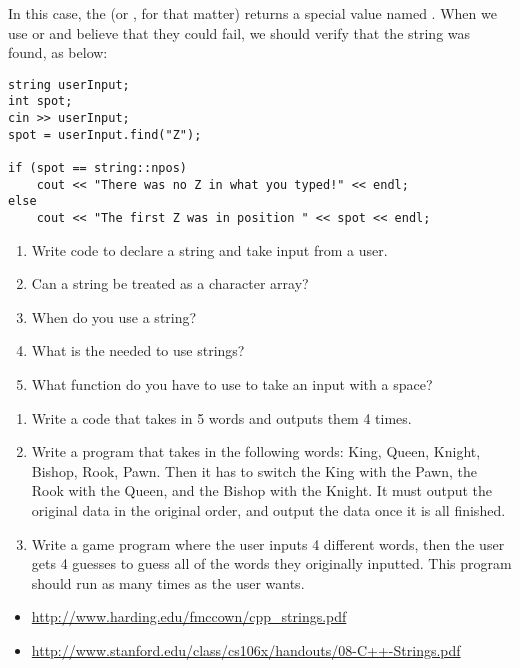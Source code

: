 \noindent In this case, the  (or , for that matter) returns a special value named .
When we use  or  and believe that they could fail, we should verify that the string was found, as below:

\noindent\begin{minipage}{\textwidth}\begin{lstlisting}
string userInput;
int spot;
cin >> userInput;
spot = userInput.find("Z");

if (spot == string::npos)
	cout << "There was no Z in what you typed!" << endl;
else
	cout << "The first Z was in position " << spot << endl;
\end{lstlisting}\end{minipage}
\begin{enumerate}
\item Write code to declare a string and take input from a user.
\item Can a string be treated as a character array?
\item When do you use a string?
\item What is the  needed to use strings?
\item What function do you have to use to take an input with a space?
\end{enumerate}

\begin{enumerate}
\item Write a code that takes in 5 words and outputs them 4 times.

\item Write a program that takes in the following words: King, Queen, Knight, Bishop, Rook, Pawn. 
Then it has to switch the King with the Pawn, the Rook with the Queen, and the Bishop with the Knight.
It must output the original data in the original order, and output the data once it is all finished.

\item Write a game program where the user inputs 4 different words, then the user gets 4 guesses to guess all of the words they originally inputted.
This program should run as many times as the user wants.
\end{enumerate}



\begin{itemize}
\item \url{http://www.harding.edu/fmccown/cpp_strings.pdf}
\item \url{http://www.stanford.edu/class/cs106x/handouts/08-C++-Strings.pdf}
\end{itemize}
